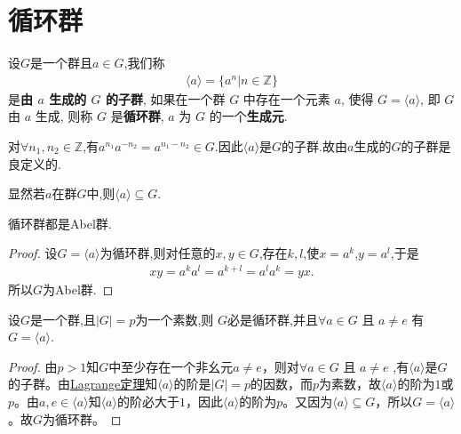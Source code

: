 \documentclass[../../main.tex]{subfiles}%
\begin{document}
\section{循环群}

\begin{definition}[循环群]
设$G$是一个群且$a\in G$,我们称
\begin{align*}
\langle a \rangle = \{a^n|n \in \mathbb{Z}\}
\end{align*}
是\textbf{由 \( a \) 生成的 \( G \) 的子群}, 如果在一个群 \( G \) 中存在一个元素 \( a \), 使得 \( G = \langle a \rangle \), 即 \( G \) 由 \( a \) 生成, 则称 \( G \) 是\textbf{循环群}, \( a \) 为 \( G \) 的一个\textbf{生成元}.
\end{definition}
\begin{remark}
对$\forall n_1,n_2\in \mathbb{Z}$,有$a^{n_1}a^{-n_2}=a^{n_1-n_2}\in G$.因此$\langle a \rangle$是$G$的子群.故由$a$生成的$G$的子群是良定义的.
\end{remark}
\begin{remark}
显然若$a$在群$G$中,则$\langle a \rangle\subseteq G.$
\end{remark}

\begin{proposition}[循环群都是Abel群]
循环群都是Abel群.
\end{proposition}
\begin{proof}
设$G=\langle a \rangle$为循环群,则对任意的$x,y \in G$,存在$k,l$,使$x=a^k$,$y=a^l$,于是
\begin{align*}
xy = a^k a^l = a^{k+l} = a^l a^k = yx.
\end{align*}
所以$G$为Abel群.
\end{proof}

\begin{proposition}[素数阶群必为循环群]\label{proposition:素数阶群必为循环群}
设$G$是一个群,且$|G|=p$为一个素数,则
$G$必是循环群,并且\( \forall a \in G \) 且 \( a \neq e \) 有 \( G = \langle a \rangle \). 
\end{proposition}
\begin{proof}
由$p>1$知$G$中至少存在一个非幺元$a\ne e$，则对\( \forall a \in G \) 且 \( a \neq e \) ,有$\langle a\rangle$是$G$的子群。由\hyperref[theorem:抽象代数--Lagrange定理]{Lagrange定理}知$\langle a\rangle$的阶是$|G|=p$的因数，而$p$为素数，故$\langle a\rangle$的阶为$1$或$p$。由$a,e\in\langle a\rangle$知$\langle a\rangle$的阶必大于$1$，因此$\langle a\rangle$的阶为$p$。又因为$\langle a\rangle\subseteq G$，所以$G=\langle a\rangle$。故$G$为循环群。
\end{proof}
\end{document}
